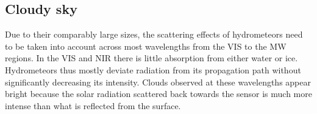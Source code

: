 %
%
%
%

\subsection{Cloudy sky}

Due to their comparably large sizes, the scattering effects of hydrometeors need
to be taken into account across most wavelengths from the VIS to the MW regions.
In the VIS and NIR there is little absorption from either water or ice.
Hydrometeors thus mostly deviate radiation from its propagation path without
significantly decreasing its intensity. Clouds observed at these wavelengths
appear bright because the solar radiation scattered back towards the sensor is
much more intense than what is reflected from the surface.

